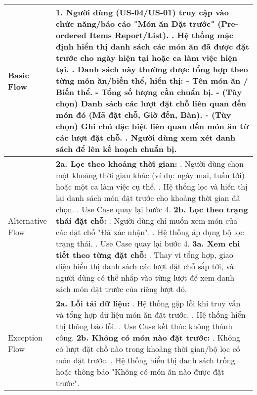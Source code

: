 \begin{longtable}{|m{4cm}|p{11cm}|}
Basic Flow & 1. Người dùng (US-04/US-01) truy cập vào chức năng/báo cáo "Món ăn Đặt trước" (Pre-ordered Items Report/List). \newline 2. Hệ thống mặc định hiển thị danh sách các món ăn đã được đặt trước cho ngày hiện tại hoặc ca làm việc hiện tại. \newline 3. Danh sách này thường được tổng hợp theo từng món ăn/biến thể, hiển thị: \newline    - Tên món ăn / Biến thể. \newline    - Tổng số lượng cần chuẩn bị. \newline    - (Tùy chọn) Danh sách các lượt đặt chỗ liên quan đến món đó (Mã đặt chỗ, Giờ đến, Bàn). \newline    - (Tùy chọn) Ghi chú đặc biệt liên quan đến món ăn từ các lượt đặt chỗ. \newline 4. Người dùng xem xét danh sách để lên kế hoạch chuẩn bị. \\
\hline
Alternative Flow & \textbf{2a. Lọc theo khoảng thời gian:} \newline    1. Người dùng chọn một khoảng thời gian khác (ví dụ: ngày mai, tuần tới) hoặc một ca làm việc cụ thể. \newline    2. Hệ thống lọc và hiển thị lại danh sách món đặt trước cho khoảng thời gian đã chọn. \newline    3. Use Case quay lại bước 4. \newline \textbf{2b. Lọc theo trạng thái đặt chỗ:} \newline    1. Người dùng chỉ muốn xem món của các đặt chỗ "Đã xác nhận". \newline    2. Hệ thống áp dụng bộ lọc trạng thái. \newline    3. Use Case quay lại bước 4. \newline \textbf{3a. Xem chi tiết theo từng đặt chỗ:} \newline    1. Thay vì tổng hợp, giao diện hiển thị danh sách các lượt đặt chỗ sắp tới, và người dùng có thể nhấp vào từng lượt để xem danh sách món đặt trước của riêng lượt đó. \\
\hline
Exception Flow & \textbf{2a. Lỗi tải dữ liệu:} \newline    1. Hệ thống gặp lỗi khi truy vấn và tổng hợp dữ liệu món ăn đặt trước. \newline    2. Hệ thống hiển thị thông báo lỗi. \newline    3. Use Case kết thúc không thành công. \newline \textbf{2b. Không có món nào đặt trước:} \newline    1. Không có lượt đặt chỗ nào trong khoảng thời gian/bộ lọc có món đặt trước. \newline    2. Hệ thống hiển thị danh sách trống hoặc thông báo "Không có món ăn nào được đặt trước". \\

\end{longtable}
